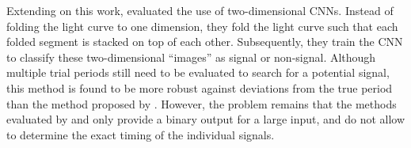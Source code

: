 Extending on this work, \cite{chintarungruangchai2019detecting} evaluated the use of two-dimensional CNNs. Instead of folding the light curve to one dimension, they fold the light curve such that each folded segment is stacked on top of each other. Subsequently, they train the CNN to classify these two-dimensional ``images'' as signal or non-signal. Although multiple trial periods still need to be evaluated to search for a potential signal, this method is found to be more robust against deviations from the true period than the method proposed by \cite{pearson2018searching}. However, the problem remains that the methods evaluated by \cite{chintarungruangchai2019detecting} and \cite{zucker2018shallow} only provide a binary output for a large input, and do not allow to determine the exact timing of the individual signals.